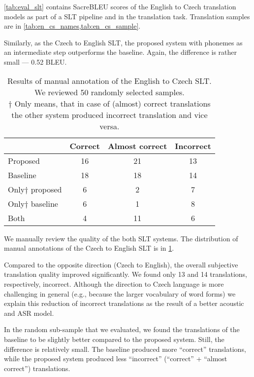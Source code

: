 \cref{tab:eval_slt} contains SacreBLEU scores of the English to Czech translation models as part of a SLT pipeline and in the translation task. Translation samples are in \cref{tab:en_cs_names,tab:en_cs_sample}.

Similarly, as the Czech to English SLT, the proposed system with phonemes as an intermediate step outperforms the baseline. Again, the difference is rather small --- 0.52 BLEU. 

\begin{table}[t]
	\centering
	\begin{tabular}{l|ccc}
		& Correct & Almost correct & Incorrect \\ \hline
		Proposed      & 16      & 21             & 13        \\
		Baseline      & 18       & 18             & 14        \\ \hline
		Only$\dagger$ proposed & 6       & 2              & 7         \\
		Only$\dagger$ baseline & 6       & 1              & 8        \\ \hline
		Both          & 4       & 11              & 6       
	\end{tabular}	
	\caption[English to Czech manual evaluation]{Results of manual annotation of the English to Czech SLT. We reviewed 50 randomly selected samples.\\$\dagger$ Only means, that in case of (almost) correct translations the other system produced incorrect translation and vice versa.}
	\label{tab:manual_en_cs}
\end{table}


We manually review the quality of the both SLT systems. The distribution of manual annotations of the Czech to English SLT is in \cref{tab:manual_en_cs}. 

Compared to the opposite direction (Czech to English), the overall subjective translation quality improved significantly. We found only 13 and 14 translations, respectively, incorrect. Although the direction to Czech language is more challenging in general (e.g., because the larger vocabulary of word forms) we explain this reduction of incorrect translations as the result of a better acoustic and ASR model.

In the random sub-sample that we evaluated, we found the translations of the baseline to be slightly better compared to the proposed system. Still, the difference is relatively small. The baseline produced more ``correct'' translations, while the proposed system produced less ``incorrect'' (``correct'' + ``almost correct'') translations. 

